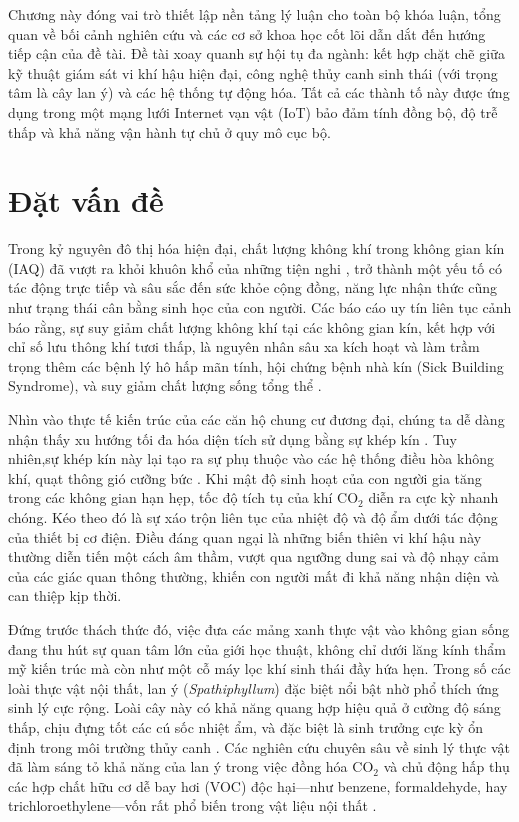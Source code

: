 Chương này đóng vai trò thiết lập nền tảng lý luận cho toàn bộ khóa luận, tổng quan về bối cảnh nghiên cứu và các cơ sở khoa học cốt lõi dẫn dắt đến hướng tiếp cận của đề tài. Đề tài xoay quanh sự hội tụ đa ngành: kết hợp chặt chẽ giữa kỹ thuật giám sát vi khí hậu hiện đại, công nghệ thủy canh sinh thái (với trọng tâm là cây lan ý) và các hệ thống tự động hóa. Tất cả các thành tố này được ứng dụng trong một mạng lưới Internet vạn vật (IoT) bảo đảm tính đồng bộ, độ trễ thấp và khả năng vận hành tự chủ ở quy mô cục bộ.

\section{Đặt vấn đề}

Trong kỷ nguyên đô thị hóa hiện đại, chất lượng không khí trong không gian kín (IAQ) đã vượt ra khỏi khuôn khổ của những tiện nghi , trở thành một yếu tố có tác động trực tiếp và sâu sắc đến sức khỏe cộng đồng, năng lực nhận thức cũng như trạng thái cân bằng sinh học của con người. Các báo cáo  uy tín liên tục cảnh báo rằng, sự suy giảm chất lượng không khí tại các không gian kín, kết hợp với chỉ số lưu thông khí tươi thấp, là nguyên nhân sâu xa kích hoạt và làm trầm trọng thêm các bệnh lý hô hấp mãn tính, hội chứng bệnh nhà kín (Sick Building Syndrome), và suy giảm chất lượng sống tổng thể \cite{who_air_pollution,epa_iaq}. 

Nhìn vào thực tế kiến trúc của các căn hộ chung cư đương đại, chúng ta dễ dàng nhận thấy xu hướng tối đa hóa diện tích sử dụng bằng sự khép kín . Tuy nhiên,sự khép kín này lại tạo ra sự phụ thuộc vào các hệ thống điều hòa không khí, quạt thông gió cưỡng bức . Khi mật độ sinh hoạt của con người gia tăng trong các không gian hạn hẹp, tốc độ tích tụ của khí CO$_2$ diễn ra cực kỳ nhanh chóng. Kéo theo đó là sự xáo trộn liên tục của  nhiệt độ và độ ẩm dưới tác động của thiết bị cơ điện. Điều đáng quan ngại là những biến thiên vi khí hậu này thường diễn tiến một cách âm thầm, vượt qua ngưỡng dung sai và độ nhạy cảm của các giác quan thông thường, khiến con người mất đi khả năng nhận diện và can thiệp kịp thời.

Đứng trước thách thức đó, việc đưa các mảng xanh thực vật vào không gian sống đang thu hút sự quan tâm lớn của giới học thuật, không chỉ dưới lăng kính thẩm mỹ kiến trúc mà còn như một cỗ máy lọc khí sinh thái đầy hứa hẹn. Trong số các loài thực vật nội thất, lan ý (\textit{Spathiphyllum}) đặc biệt nổi bật nhờ phổ thích ứng sinh lý cực rộng. Loài cây này có khả năng quang hợp hiệu quả ở cường độ sáng thấp, chịu đựng tốt các cú sốc nhiệt ẩm, và đặc biệt là sinh trưởng cực kỳ ổn định trong môi trường thủy canh \cite{peace_lily_care_bhg,peace_lily_hydro_brightlane}. Các nghiên cứu chuyên sâu về sinh lý thực vật đã làm sáng tỏ khả năng của lan ý trong việc đồng hóa CO$_2$ và chủ động hấp thụ các hợp chất hữu cơ dễ bay hơi (VOC) độc hại—như benzene, formaldehyde, hay trichloroethylene—vốn rất phổ biến trong vật liệu nội thất \cite{hydroponic_iaq_survey,nasa_clean_air}. 

